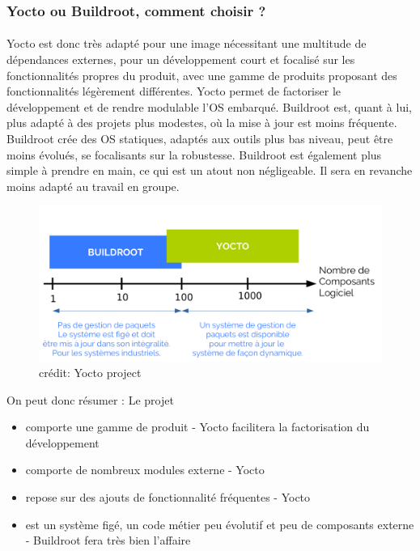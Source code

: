 
\subsubsection{Yocto ou Buildroot, comment choisir ?}
\paragraph{}
Yocto est donc très adapté pour une image nécessitant une multitude de dépendances externes, pour un développement court et focalisé sur les fonctionnalités propres du produit, avec une gamme de produits proposant des fonctionnalités légèrement différentes. Yocto permet de factoriser le développement et de rendre modulable l'OS embarqué.  Buildroot est, quant à lui, plus adapté à des projets plus modestes, où la mise à jour est moins fréquente. Buildroot crée des OS statiques, adaptés aux outils plus bas niveau, peut être moins évolués, se focalisants sur la robustesse. Buildroot est également plus simple à prendre en main, ce qui est un atout non négligeable. Il sera en revanche moins adapté au travail en groupe. 


\begin{figure}[ht!] 
\begin{center}
    

\includegraphics[width=13cm]{Images/yocto comp log.png} %

\caption{crédit: Yocto project} %

\end{center}
\label{Project Yocto} %
\end{figure}

On peut donc résumer : 
Le projet
\begin{itemize}

\item comporte une gamme de produit - Yocto facilitera la factorisation du développement
\item comporte de nombreux modules externe - Yocto
\item repose sur des ajouts de fonctionnalité fréquentes - Yocto
\item est un système figé, un code métier peu évolutif et peu de composants externe - Buildroot fera très bien l'affaire
\end{itemize}

